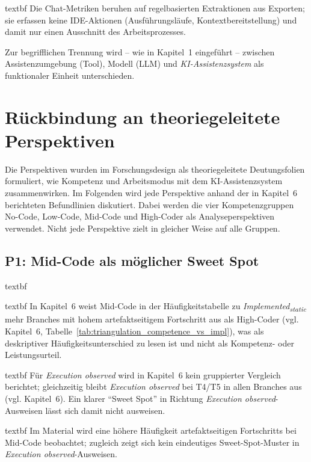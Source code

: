 	\csname textbf Die Chat-Metriken beruhen auf regelbasierten Extraktionen aus Exporten; sie erfassen keine IDE-Aktionen (Ausf\"uhrungsl\"aufe, Kontextbereitstellung) und damit nur einen Ausschnitt des Arbeitsprozesses.

Zur begrifflichen Trennung wird -- wie in Kapitel~1 eingef\"uhrt -- zwischen Assistenzumgebung (Tool), Modell (LLM) und \emph{KI-Assistenzsystem} als funktionaler Einheit unterschieden.

\section{R\"uckbindung an theoriegeleitete Perspektiven}
\label{sec:discussion_perspectives}

Die Perspektiven wurden im Forschungsdesign als theoriegeleitete Deutungsfolien formuliert, wie Kompetenz und Arbeitsmodus mit dem KI-Assistenzsystem zusammenwirken.
Im Folgenden wird jede Perspektive anhand der in Kapitel~6 berichteten Befundlinien diskutiert.
Dabei werden die vier Kompetenzgruppen No-Code, Low-Code, Mid-Code und High-Coder als Analyseperspektiven verwendet.
Nicht jede Perspektive zielt in gleicher Weise auf alle Gruppen.

\subsection{P1: Mid-Code als m\"oglicher Sweet Spot}
\label{sec:discussion_p1}

	\csname textbf

	\csname textbf In Kapitel~6 weist Mid-Code in der H\"aufigkeitstabelle zu \textit{Implemented\textsubscript{static}} mehr Branches mit hohem artefaktseitigem Fortschritt aus als High-Coder (vgl. Kapitel~6, Tabelle~\ref{tab:triangulation_competence_vs_impl}), was als deskriptiver H\"aufigkeitsunterschied zu lesen ist und nicht als Kompetenz- oder Leistungsurteil.

	\csname textbf F\"ur \textit{Execution observed} wird in Kapitel~6 kein gruppierter Vergleich berichtet; gleichzeitig bleibt \textit{Execution observed} bei T4/T5 in allen Branches aus (vgl. Kapitel~6). Ein klarer \enquote{Sweet Spot} in Richtung \textit{Execution observed}-Ausweisen l\"asst sich damit nicht ausweisen.

	\csname textbf Im Material wird eine h\"ohere H\"aufigkeit artefaktseitigen Fortschritts bei Mid-Code beobachtet; zugleich zeigt sich kein eindeutiges Sweet-Spot-Muster in \textit{Execution observed}-Ausweisen.

